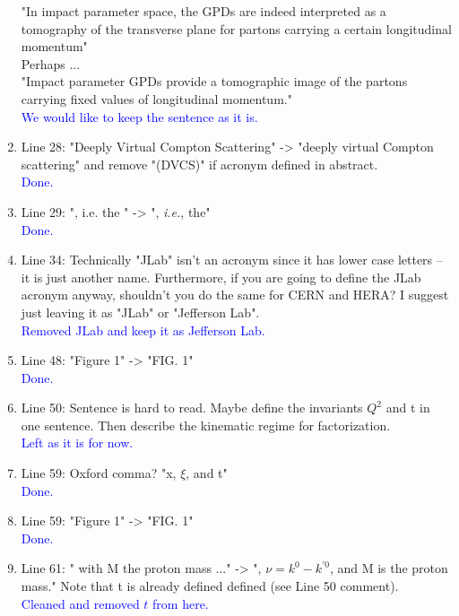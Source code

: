 \documentclass[a4paper,11pt,twoside]{article}
\begin{document}
\begin{enumerate}
 "In impact parameter space, the GPDs are indeed interpreted as a tomography of 
 the transverse plane for partons carrying a certain longitudinal momentum"\\

Perhaps ...\\

"Impact parameter GPDs provide a tomographic image of the partons
carrying fixed values of longitudinal momentum."\\
\textcolor{blue}{We would like to keep the sentence as it is. }
  
\item Line 28: "Deeply Virtual Compton Scattering" -> "deeply virtual Compton
scattering" and remove "(DVCS)" if acronym defined  in  abstract.\\
\textcolor{blue}{Done.}
  
\item Line 29: ", i.e. the " -> ", \textit{i.e.}, the"\\
\textcolor{blue}{Done. }
  
\item Line 34: Technically "JLab" isn't an acronym since it has lower case
letters -- it is just another name. Furthermore, if you are going to
define the JLab acronym anyway, shouldn't you do the same for CERN and
HERA? I suggest just leaving it as "JLab" or "Jefferson Lab".\\
\textcolor{blue}{Removed JLab and keep it as Jefferson Lab. }
  
\item Line 48: "Figure 1" -> "FIG. 1"\\
\textcolor{blue}{Done.}
  
\item Line 50: Sentence is hard to read. Maybe define the invariants $Q^2$ and t
in one sentence. Then describe the kinematic regime for factorization.\\
\textcolor{blue}{Left as it is for now. }
  
\item Line 59: Oxford comma?  "x, $\xi$, and t"\\
\textcolor{blue}{Done. }
  
\item Line 59: "Figure 1" -> "FIG. 1"\\
\textcolor{blue}{Done. }
  
\item Line 61: " with M the proton mass ..." ->
", $\nu = k^0-k^{\prime0}$, and M is the proton mass." Note that t is
already defined defined (see Line 50 comment).\\
\textcolor{blue}{Cleaned and removed $t$ from here.}
  

\end{enumerate}
\end{document}

